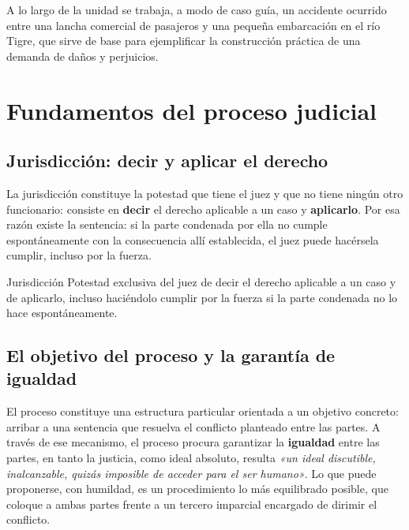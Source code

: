 \documentclass[12pt,oneside]{book}
\begin{document}
A lo largo de la unidad se trabaja, a modo de caso guía, un accidente ocurrido entre una lancha comercial de pasajeros y una pequeña embarcación en el río Tigre, que sirve de base para ejemplificar la construcción práctica de una demanda de daños y perjuicios.

\chapter[Fundamentos del proceso judicial]{Fundamentos del proceso judicial}

\section{Jurisdicción: decir y aplicar el derecho}

La jurisdicción constituye la potestad que tiene el juez y que no tiene ningún otro funcionario: consiste en \textbf{decir} el derecho aplicable a un caso y \textbf{aplicarlo}. Por esa razón existe la sentencia: si la parte condenada por ella no cumple espontáneamente con la consecuencia allí establecida, el juez puede hacérsela cumplir, incluso por la fuerza.

\begin{definition}{Jurisdicción}
Potestad exclusiva del juez de decir el derecho aplicable a un caso y de aplicarlo, incluso haciéndolo cumplir por la fuerza si la parte condenada no lo hace espontáneamente.
\end{definition}

\section{El objetivo del proceso y la garantía de igualdad}

El proceso constituye una estructura particular orientada a un objetivo concreto: arribar a una sentencia que resuelva el conflicto planteado entre las partes. A través de ese mecanismo, el proceso procura garantizar la \textbf{igualdad} entre las partes, en tanto la justicia, como ideal absoluto, resulta \textit{«un ideal discutible, inalcanzable, quizás imposible de acceder para el ser humano»}. Lo que puede proponerse, con humildad, es un procedimiento lo más equilibrado posible, que coloque a ambas partes frente a un tercero imparcial encargado de dirimir el conflicto.
\end{document}
